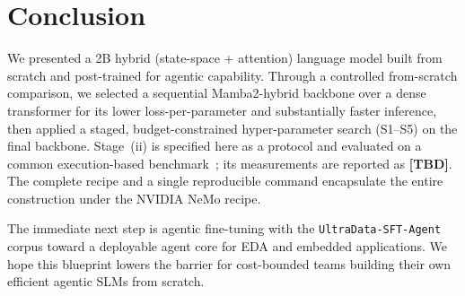 ﻿\section{Conclusion}

We presented a 2B hybrid (state-space + attention) language model built from scratch and post-trained for agentic capability.
Through a controlled from-scratch comparison, we selected a sequential Mamba2-hybrid backbone over a dense transformer for its lower loss-per-parameter and substantially faster inference, then applied a staged, budget-constrained hyper-parameter search (S1--S5) on the final backbone.
Stage~(ii) is specified here as a protocol and evaluated on a common execution-based benchmark~\cite{liu2026zhulong}; its measurements are reported as \textbf{[TBD]}.
The complete recipe and a single reproducible command encapsulate the entire construction under the NVIDIA NeMo recipe.

The immediate next step is agentic fine-tuning with the \texttt{UltraData-SFT-Agent} corpus toward a deployable agent core for EDA and embedded applications.
We hope this blueprint lowers the barrier for cost-bounded teams building their own efficient agentic SLMs from scratch.
